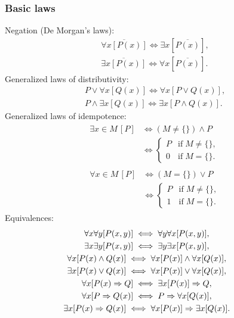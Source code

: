 \subsubsection{Basic laws}
Negation (De Morgan's laws):
\begin{gather}
\overline{\forall x[P(x)]}\iff \exists x[\overline{P(x)}],\\
\overline{\exists x[P(x)]}\iff \forall x[\overline{P(x)}].
\end{gather}
Generalized laws of distributivity:
\begin{gather}
P\lor\forall x[Q(x)] \iff \forall x[P\lor Q(x)],\\
P\land\exists x[Q(x)] \iff \exists x[P\land Q(x)].
\end{gather}
Generalized laws of idempotence:
\begin{gather}
\begin{split}
\exists x{\in}M\,[P] & \iff
(M\ne\{\})\land P\\
& \iff\begin{cases}
P & \text{if}\; M\ne\{\},\\
0 & \text{if}\; M=\{\}.
\end{cases}
\end{split}\\
\begin{split}
\forall x{\in}M\,[P]& \iff
(M=\{\})\lor P\\
&\iff\begin{cases}
P & \text{if}\; M\ne\{\},\\
1 & \text{if}\; M=\{\}.
\end{cases}
\end{split}
\end{gather}
Equivalences:
\begin{gather}
\hspace{-2em}\forall x\forall y[P(x,y)] \iff \forall y\forall x[P(x,y)],\\
\hspace{-2em}\exists x\exists y[P(x,y)] \iff \exists y\exists x[P(x,y)],\\
\hspace{-2em}\forall x[P(x)\land Q(x)] \iff \forall x[P(x)]\land\forall x[Q(x)],\\
\hspace{-2em}\exists x[P(x)\lor Q(x)] \iff \forall x[P(x)]\lor\forall x[Q(x)],\\
\hspace{-2em}\forall x[P(x)\Rightarrow Q] \iff \exists x[P(x)]\Rightarrow Q,\\
\hspace{-2em}\forall x[P\Rightarrow Q(x)] \iff P\Rightarrow\forall x[Q(x)],\\
\hspace{-2em}\exists x[P(x)\Rightarrow Q(x)]
  \iff\forall x[P(x)]\Rightarrow\exists x[Q(x)].
\end{gather}
